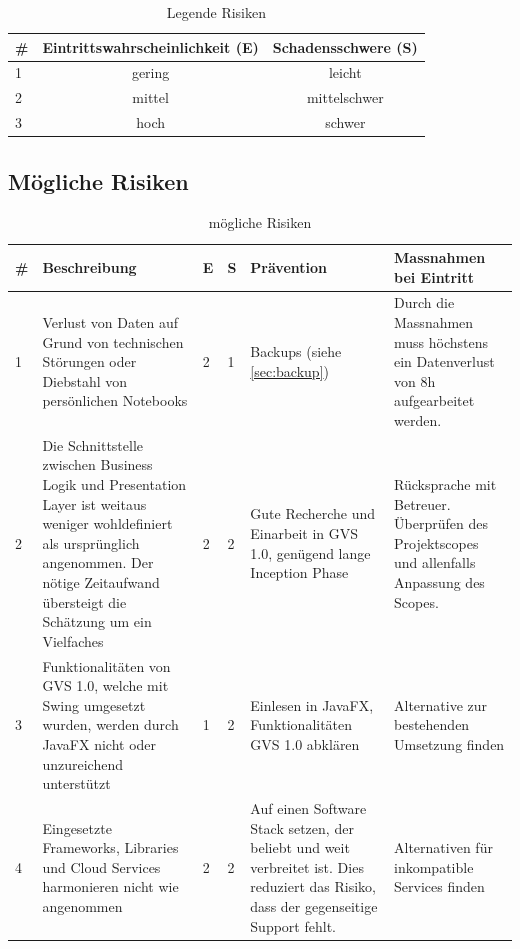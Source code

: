 \documentclass[11pt,a4paper,english,oneside]{book}
\numberwithin{equation}{chapter}
\begin{document}
	\begin{table}[h!]
		\centering
		\begin{tabular}{l c c}
			\toprule 
			\# & Eintrittswahrscheinlichkeit (E) & Schadensschwere (S) \\
			\toprule 
			1 & gering & leicht  \\
			2 & mittel & mittelschwer \\
			3 & hoch & schwer \\
			\bottomrule 
		\end{tabular} 
		\caption{Legende Risiken} 
	\end{table}
	\begin{landscape}		
		\subsection{Mögliche Risiken}
			\begin{table}[h!]
			\centering
			\begin{tabularx}{\linewidth}{l X l l X X}
				\toprule 
				\# & Beschreibung & E & S & Prävention & Massnahmen bei Eintritt \\
				\toprule 
				1 & Verlust von Daten auf Grund von technischen Störungen oder Diebstahl von persönlichen Notebooks & 2 & 1 & Backups (siehe \ref{sec:backup}) & Durch die Massnahmen muss höchstens ein Datenverlust von 8h aufgearbeitet werden. \\
				\midrule
				2 & Die Schnittstelle zwischen Business Logik und Presentation Layer ist weitaus weniger wohldefiniert als ursprünglich angenommen. Der nötige Zeitaufwand übersteigt die Schätzung um ein Vielfaches & 2 & 2 & Gute Recherche und Einarbeit in GVS 1.0, genügend lange Inception Phase & Rücksprache mit Betreuer. Überprüfen des Projektscopes und allenfalls Anpassung des Scopes. \\
				\midrule
				3 & Funktionalitäten von GVS 1.0, welche mit Swing umgesetzt wurden, werden durch JavaFX nicht oder unzureichend unterstützt & 1 & 2 & Einlesen in JavaFX, Funktionalitäten GVS 1.0 abklären & Alternative zur bestehenden Umsetzung finden \\
				\midrule
				4 & Eingesetzte Frameworks, Libraries und Cloud Services harmonieren nicht wie angenommen & 2 & 2 & Auf einen Software Stack setzen, der beliebt und weit verbreitet ist. Dies reduziert das Risiko, dass der gegenseitige Support fehlt. & Alternativen für inkompatible Services finden \\  
				\bottomrule 
			\end{tabularx} 
			\caption{mögliche Risiken} 
		\end{table}
    \end{landscape}
\end{document}
